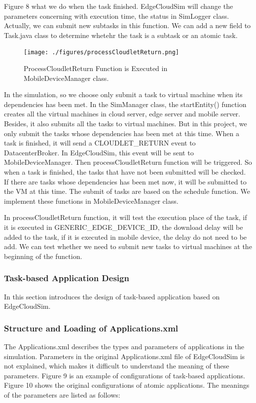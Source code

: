 Figure 8 what we do when the task finished. EdgeCloudSim will change the parameters concerning with execution time, the status in SimLogger class. Actually, we can submit new subtasks in this function. We can add a new field to Task.java class to determine whetehr the task is a subtask or an atomic task.
\begin{figure}
	\centering
	\texttt{[image: ./figures/processCloudletReturn.png]}
	\caption{\label{fig:frog}ProcessCloudletReturn Function is Executed in MobileDeviceManager class.}
\end{figure}

 In the simulation, so we choose only submit a task to virtual machine when its dependencies has been met. In the SimManager class, the startEntity() function creates all the virtual machines in cloud server, edge server and mobile server. Besides, it also submits all the tasks to virtual machines. But in this project, we only submit the tasks whose dependencies has been met at this time. When a task is finished, it will send a CLOUDLET\_RETURN event to DatacenterBroker. In EdgeCloudSim, this event will be sent to MobileDeviceManager. Then processCloudletReturn function will be triggered. So when a task is finished, the tasks that have not been submitted will be checked. If there are tasks whose dependencies has been met now, it will be submitted to the VM at this time. The submit of tasks are based on the schedule function. We implement these functions in MobileDeviceManager class.

In processCloudletReturn function, it will test the execution place of the task, if it is executed in GENERIC\_EDGE\_DEVICE\_ID, the download delay will be added to the task, if it is executed in mobile device, the delay do not need to be add. We can test whether we need to submit new tasks to virtual machines at the  beginning of the function. 

\subsubsection{Task-based Application Design}
In this section introduces the design of task-based application based on EdgeCloudSim.

\subsubsection{Structure and Loading of Applications.xml}
The Applications.xml describes the types and parameters of applications in the simulation. Parameters in the original Applications.xml file of EdgeCloudSim is not explained, which makes it difficult to understand the meaning of these parameters. Figure 9 is an example of configurations of task-based applications. Figure 10 shows the original configurations of atomic applications.
The meanings of the parameters are listed as follows:

